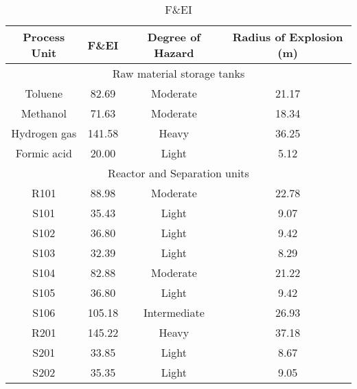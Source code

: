 \begin{table}[H]
\caption{F\&EI }
\label{tab:radius}
\begin{tabular}{cccc}
\toprule\textbf{Process   Unit} & \textbf{F\&EI} & \textbf{Degree of Hazard} & \textbf{Radius of   Explosion (m)} \\\bottomrule
\multicolumn{4}{c}{Raw   material storage tanks}   
\\\hline
Toluene                 & 82.69          & Moderate                  & 21.17                              \\
Methanol                & 71.63          & Moderate                  & 18.34                              \\
Hydrogen gas            & 141.58         & Heavy                     & 36.25                              \\
Formic acid             & 20.00          & Light                     & 5.12                               \\\hline
\multicolumn{4}{c}{Reactor and Separation units}                                                        \\\hline
R101                    & 88.98          & Moderate                  & 22.78                              \\
S101                    & 35.43          & Light                     & 9.07                               \\
S102                    & 36.80          & Light                     & 9.42                               \\
S103                    & 32.39          & Light                     & 8.29                               \\
S104                    & 82.88          & Moderate                  & 21.22                              \\
S105                    & 36.80          & Light                     & 9.42                               \\
S106                    & 105.18         & Intermediate              & 26.93                              \\
R201                    & 145.22         & Heavy                     & 37.18                              \\
S201                    & 33.85          & Light                     & 8.67                               \\
S202                    & 35.35          & Light                     & 9.05                               \\

\end{tabular}
\end{table}
